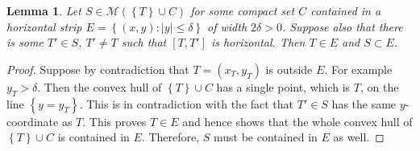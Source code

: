 \documentclass{amsart}
\newcommand{\abs}[1]{\left\vert #1 \right\vert}
\newcommand{\ENCLOSE}[1]{\left\{#1\right\}}
\newcommand{\M}{\mathcal{M}}
\newtheorem{lemma}[theorem]{Lemma}
\theoremstyle{definition}
\theoremstyle{remark}
\begin{document}
\begin{lemma}\label{lm:envelope}
Let $S\in \M(\ENCLOSE{T}\cup C)$
for some compact set $C$ contained in a horizontal strip 
$E=\ENCLOSE{(x,y)\colon \abs{y}\le \delta}$ of width $2\delta>0$.
Suppose also that there is some $T'\in S$, $T'\neq T$ 
such that $[T,T']$ is horizontal.
Then $T\in E$ and $S\subset E$.
\end{lemma}
%
\begin{proof}
  Suppose by contradiction that $T=(x_T,y_T)$ is outside $E$.
  For example $y_T>\delta$. 
  Then the convex hull of $\ENCLOSE{T}\cup C$ has a single 
  point, which is $T$, on the line $\ENCLOSE{y=y_T}$. 
  This is in contradiction with the fact that $T'\in S$ 
  has the same $y$-coordinate as $T$.
  This proves $T\in E$ and hence
  shows that the whole convex hull of 
  $\ENCLOSE{T}\cup C$ is contained in $E$. 
  Therefore, $S$ must be contained in $E$ as well.
\end{proof}
\end{document}
